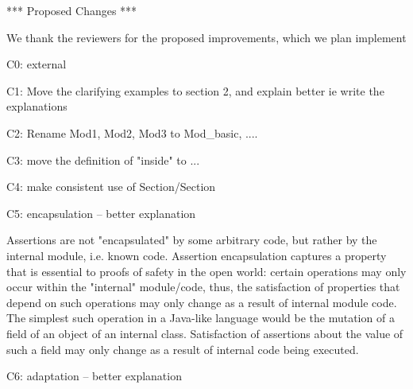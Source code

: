 
 

*** Proposed Changes ***

We thank the reviewers for the proposed improvements, which we plan implement

C0: external

C1: Move the clarifying examples to section 2, and explain better
ie write the explanations

C2: Rename Mod1, Mod2, Mod3 to Mod_{basic}, ....

C3: move the definition of "inside" to ...

C4: make consistent use of Section/Section

C5: encapsulation -- better explanation

Assertions are not "encapsulated" by some arbitrary code, but rather by the internal module, i.e. known code. Assertion encapsulation captures a property that is essential to proofs of safety in the open world: certain operations may only occur within the "internal" module/code, thus, the satisfaction of properties that depend on such operations may only change as a result of internal module code. The simplest such operation in a Java-like language would be the mutation of a field of an object of an internal class. Satisfaction of assertions about the value of such a field may only change as a result of internal code being executed.
 
C6: adaptation -- better explanation

